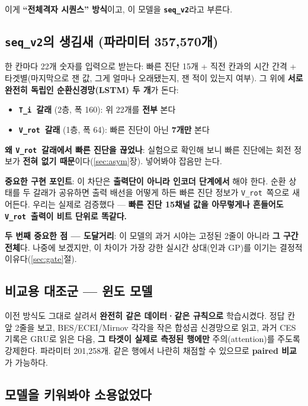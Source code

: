 \documentclass[10pt]{article}
\newcommand{\Ti}{\texttt{T\_i}}
\newcommand{\Vrot}{\texttt{V\_rot}}
\newcommand{\seqv}{\texttt{seq\_v2}}
\begin{document}
이게 \textbf{``전체격자 시퀀스'' 방식}이고, 이 모델을 \textbf{\seqv}라고 부른다.

\subsection{\seqv 의 생김새 (파라미터 357{,}570개)}

한 칸마다 22개 숫자를 입력으로 받는다: 빠른 진단 15개 + 직전 칸과의 시간 간격 +
타겟별(마지막으로 잰 값, 그게 얼마나 오래됐는지, 잰 적이 있는지 여부).
그 위에 \textbf{서로 완전히 독립인 순환신경망(LSTM) 두 개}가 돈다:

\begin{itemize}
\item \textbf{\Ti\ 갈래} (2층, 폭 160): 위 22개를 \textbf{전부} 본다
\item \textbf{\Vrot\ 갈래} (1층, 폭 64): 빠른 진단이 아닌 \textbf{7개만} 본다
\end{itemize}

\textbf{왜 \Vrot\ 갈래에서 빠른 진단을 끊었나}: 실험으로 확인해 보니 빠른 진단에는 회전
정보가 \textbf{전혀 없기 때문}이다(\ref{sec:asym}장). 넣어봐야 잡음만 는다.

\textbf{중요한 구현 포인트}: 이 차단은 \textbf{출력단이 아니라 인코더 단계에서} 해야 한다.
순환 상태를 두 갈래가 공유하면 출력 배선을 어떻게 하든 빠른 진단 정보가 \Vrot\ 쪽으로
새어든다. 우리는 실제로 검증했다 --- \textbf{빠른 진단 15채널 값을 아무렇게나 흔들어도
\Vrot\ 출력이 비트 단위로 똑같다.}

\textbf{두 번째 중요한 점 --- 도달거리}: 이 모델의 과거 시야는 고정된 2줄이 아니라
\textbf{그 구간 전체}다. 나중에 보겠지만, 이 차이가 가장 강한 실시간 상대(인과 GP)를
이기는 결정적 이유다(\ref{sec:gate}절).

\subsection{비교용 대조군 --- 윈도 모델}

이전 방식도 그대로 살려서 \textbf{완전히 같은 데이터·같은 규칙으로} 학습시켰다. 정답 칸 앞
2줄을 보고, BES/ECEI/Mirnov 각각을 작은 합성곱 신경망으로 읽고, 과거 CES 기록은 GRU로 읽은
다음, \textbf{그 타겟이 실제로 측정된 행에만} 주의(attention)를 주도록 강제한다.
파라미터 201{,}258개. 같은 행에서 나란히 채점할 수 있으므로 \textbf{paired 비교}가 가능하다.

\subsection{모델을 키워봐야 소용없었다}
\end{document}
